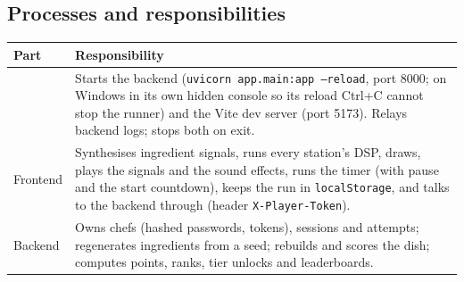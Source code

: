 \documentclass[11pt,a4paper]{article}
\begin{document}
\subsection{Processes and responsibilities}
\begin{longtable}{@{}P{3.4cm}P{12.1cm}@{}}
\toprule
Part & Responsibility \\
\midrule
\endhead
{} & Starts the backend (\texttt{uvicorn app.main:app --reload}, port 8000; on Windows in its own hidden console so its reload Ctrl+C cannot stop the runner) and the Vite dev server (port 5173). Relays backend logs; stops both on exit. \\
Frontend & Synthesises ingredient signals, runs every station's DSP, draws, plays the signals and the sound effects, runs the timer (with pause and the start countdown), keeps the run in \texttt{localStorage}, and talks to the backend through  (header \texttt{X-Player-Token}). \\
Backend & Owns chefs (hashed passwords, tokens), sessions and attempts; regenerates ingredients from a seed; rebuilds and scores the dish; computes points, ranks, tier unlocks and leaderboards. \\
\bottomrule
\end{longtable}
\end{document}
